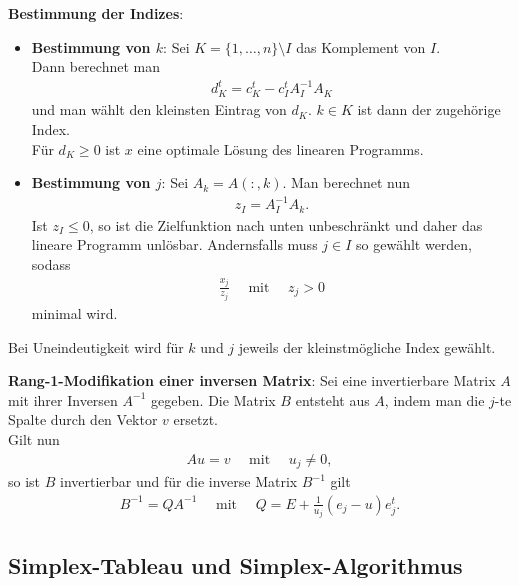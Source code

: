 \textbf{Bestimmung der Indizes}:
\begin{itemize}
    \item
    \textbf{Bestimmung von $k$}:
    Sei $K = \{1, \dotsc, n\} \setminus I$ das Komplement von $I$. \\
    Dann berechnet man
    \begin{align*}
        d_K^t = c_K^t - c_I^t A_I^{-1} A_K
    \end{align*}
    und man wählt den kleinsten Eintrag von $d_K$.
    $k \in K$ ist dann der zugehörige Index. \\
    Für $d_K \ge 0$ ist $x$ eine optimale Lösung des linearen Programms.
    
    \item
    \textbf{Bestimmung von $j$}:
    Sei $A_k = A(:, k)$.
    Man berechnet nun
    \begin{align*}
        z_I = A_I^{-1} A_k.
    \end{align*}
    Ist $z_I \le 0$, so ist die Zielfunktion nach unten unbeschränkt
    und daher das lineare Programm unlösbar.
    Andernsfalls muss $j \in I$ so gewählt werden, sodass 
    \begin{align*}
        \frac{x_j}{z_j} \quad\text{ mit }\quad z_j > 0
    \end{align*}
    minimal wird.
\end{itemize}
Bei Uneindeutigkeit wird für $k$ und $j$ jeweils der kleinstmögliche Index
gewählt.

\linie

\textbf{Rang-1-Modifikation einer inversen Matrix}:
Sei eine invertierbare Matrix $A$ mit ihrer Inversen $A^{-1}$ gegeben.
Die Matrix $B$ entsteht aus $A$, indem man die $j$-te Spalte durch den
Vektor $v$ ersetzt. \\
Gilt nun
\begin{align*}
    Au = v \quad\text{ mit }\quad u_j \not= 0,
\end{align*}
so ist $B$ invertierbar und für die inverse Matrix $B^{-1}$ gilt
\begin{align*}
    B^{-1} = QA^{-1} \quad\text{ mit }\quad
    Q = E + \frac{1}{u_j} (e_j - u) e_j^t.
\end{align*}

\pagebreak

\subsection{%
    Simplex-Tableau und Simplex-Algorithmus%
}

